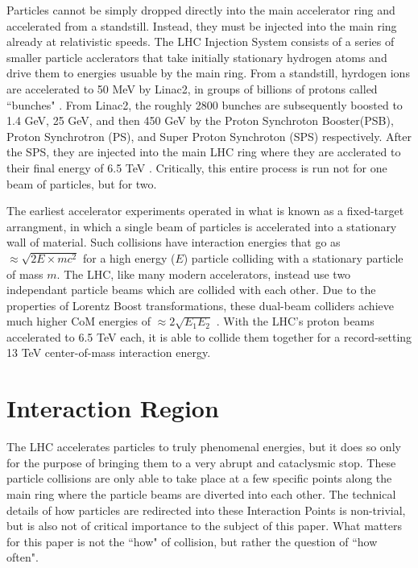    Particles cannot be simply dropped directly into the main accelerator ring and accelerated from a standstill.
    Instead, they must be injected into the main ring already at relativistic speeds.
    The LHC Injection System consists of a series of smaller particle acclerators that take initially stationary hydrogen atoms and drive them to energies usuable by the main ring.
    From a standstill, hyrdogen ions are accelerated to 50 MeV by Linac2, in groups of billions of protons called ``bunches" \cite{lhc_run2}.
    From Linac2, the roughly 2800 bunches are subsequently boosted to 1.4 GeV, 25 GeV, and then 450 GeV by the Proton Synchroton Booster(PSB), Proton Synchrotron (PS), and Super Proton Synchroton (SPS) respectively.
    After the SPS, they are injected into the main LHC ring where they are acclerated to their final energy of 6.5 TeV \cite{lhc_machine}.
    Critically, this entire process is run not for one beam of particles, but for two.

    The earliest accelerator experiments operated in what is known as a fixed-target arrangment, in which a single beam of particles is accelerated into a stationary wall of material.
    Such collisions have interaction energies that go as $\approx \sqrt{2 E \times m c^2}$ for a high energy ($E$) particle colliding with a stationary particle of mass $m$.
    The LHC, like many modern accelerators, instead use two independant particle beams which are collided with each other.
    Due to the properties of Lorentz Boost transformations, these dual-beam colliders achieve much higher CoM energies of $\approx 2 \sqrt{E_1 E_2}$ \cite{modern_and_future_colliders}.
    With the LHC's proton beams accelerated to 6.5 TeV each, it is able to collide them together for a record-setting 13 TeV center-of-mass interaction energy.


\section{Interaction Region}
    The LHC accelerates particles to truly phenomenal energies, but it does so only for the purpose of bringing them to a very abrupt and cataclysmic stop.
    These particle collisions are only able to take place at a few specific points along the main ring where the particle beams are diverted into each other.
    The technical details of how particles are redirected into these Interaction Points is non-trivial, but is also not of critical importance to the subject of this paper.
    What matters for this paper is not the ``how" of collision, but rather the question of ``how often".

